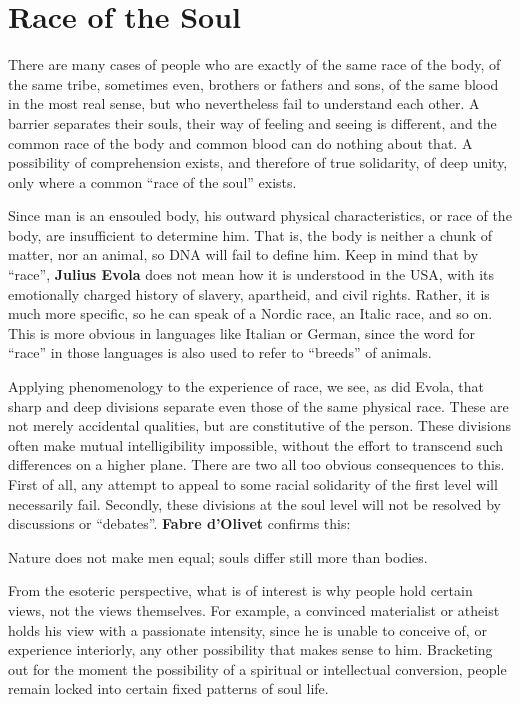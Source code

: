 \section{Race of the Soul}

\begin{quotex}
There are many cases of people who are exactly of the same race of the body, of the same tribe, sometimes even, brothers or fathers and sons, of the same blood in the most real sense, but who nevertheless fail to understand each other. A barrier separates their souls, their way of feeling and seeing is different, and the common race of the body and common blood can do nothing about that. A possibility of comprehension exists, and therefore of true solidarity, of deep unity, only where a common ``race of the soul'' exists.
\end{quotex}


Since man is an ensouled body, his outward physical characteristics, or race of the body, are insufficient to determine him. That is, the body is neither a chunk of matter, nor an animal, so DNA will fail to define him. Keep in mind that by ``race'', \textbf{Julius Evola} does not mean how it is understood in the USA, with its emotionally charged history of slavery, apartheid, and civil rights. Rather, it is much more specific, so he can speak of a Nordic race, an Italic race, and so on. This is more obvious in languages like Italian or German, since the word for ``race'' in those languages is also used to refer to ``breeds'' of animals.

Applying phenomenology to the experience of race, we see, as did Evola, that sharp and deep divisions separate even those of the same physical race. These are not merely accidental qualities, but are constitutive of the person. These divisions often make mutual intelligibility impossible, without the effort to transcend such differences on a higher plane. There are two all too obvious consequences to this. First of all, any attempt to appeal to some racial solidarity of the first level will necessarily fail. Secondly, these divisions at the soul level will not be resolved by discussions or ``debates''. \textbf{Fabre d'Olivet} confirms this:

\begin{quotex}
Nature does not make men equal; souls differ still more than bodies.
\end{quotex}


From the esoteric perspective, what is of interest is why people hold certain views, not the views themselves. For example, a convinced materialist or atheist holds his view with a passionate intensity, since he is unable to conceive of, or experience interiorly, any other possibility that makes sense to him. Bracketing out for the moment the possibility of a spiritual or intellectual conversion, people remain locked into certain fixed patterns of soul life.


